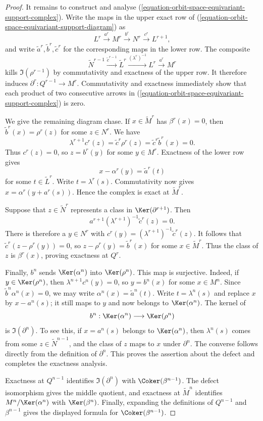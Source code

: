 \begin{proof}
It remains to construct and analyse
(\ref{equation-orbit-space-equivariant-support-complex}). Write the maps in
the upper exact row of
(\ref{equation-orbit-space-equivariant-support-diagram}) as
$$
L^r\xrightarrow{a^r}M^r\xrightarrow{b^r}N^r
\xrightarrow{c^r}L^{r+1},
$$
and write $\widetilde a^r,\widetilde b^r,\widetilde c^r$ for the
corresponding maps in the lower row. The composite
$$
\widetilde N^{r-1}\xrightarrow{\widetilde c^{r-1}}
\widetilde L^r\xrightarrow{(\lambda^r)^{-1}}L^r
\xrightarrow{a^r}M^r
$$
kills $\Im(\rho^{r-1})$ by commutativity and exactness of the upper row.
It therefore induces $\partial^r:Q^{r-1}\to M^r$. Commutativity and
exactness immediately show that each product of two consecutive arrows in
(\ref{equation-orbit-space-equivariant-support-complex}) is zero.

We give the remaining diagram chase. If
$x\in\widetilde M^r$ has $\beta^r(x)=0$, then
$\widetilde b^r(x)=\rho^r(z)$ for some $z\in N^r$. We have
$$
\lambda^{r+1}c^r(z)
=\widetilde c^r\rho^r(z)
=\widetilde c^r\widetilde b^r(x)=0.
$$
Thus $c^r(z)=0$, so $z=b^r(y)$ for some $y\in M^r$. Exactness of the
lower row gives
$$
x-\alpha^r(y)=\widetilde a^r(t)
$$
for some $t\in\widetilde L^r$. Write $t=\lambda^r(s)$. Commutativity now
gives $x=\alpha^r(y+a^r(s))$. Hence the complex is exact at
$\widetilde M^r$.

Suppose that $z\in\widetilde N^r$ represents a class in
$\Ker(\partial^{r+1})$. Then
$$
a^{r+1}(\lambda^{r+1})^{-1}\widetilde c^r(z)=0.
$$
There is therefore a $y\in N^r$ with
$c^r(y)=(\lambda^{r+1})^{-1}\widetilde c^r(z)$. It follows that
$\widetilde c^r(z-\rho^r(y))=0$, so
$z-\rho^r(y)=\widetilde b^r(x)$ for some $x\in\widetilde M^r$. Thus the
class of $z$ is $\beta^r(x)$, proving exactness at $Q^r$.

Finally, $b^n$ sends $\Ker(\alpha^n)$ into $\Ker(\rho^n)$. This map is
surjective. Indeed, if $y\in\Ker(\rho^n)$, then
$\lambda^{n+1}c^n(y)=0$, so $y=b^n(x)$ for some $x\in M^n$. Since
$\widetilde b^n\alpha^n(x)=0$, we may write
$\alpha^n(x)=\widetilde a^n(t)$. Write $t=\lambda^n(s)$ and replace $x$ by
$x-a^n(s)$; it still maps to $y$ and now belongs to
$\Ker(\alpha^n)$. The kernel of
$$
b^n:\Ker(\alpha^n)\longrightarrow\Ker(\rho^n)
$$
is $\Im(\partial^n)$. To see this, if $x=a^n(s)$ belongs to
$\Ker(\alpha^n)$, then $\lambda^n(s)$ comes from some
$z\in\widetilde N^{n-1}$, and the class of $z$ maps to $x$ under
$\partial^n$. The converse follows directly from the definition of
$\partial^n$. This proves the assertion about the defect and completes the
exactness analysis.

Exactness at $Q^{n-1}$ identifies $\Im(\partial^n)$ with
$\Coker(\beta^{n-1})$. The defect isomorphism gives the middle quotient,
and exactness at $\widetilde M^n$ identifies
$M^n/\Ker(\alpha^n)$ with $\Ker(\beta^n)$. Finally, expanding the
definitions of $Q^{n-1}$ and $\beta^{n-1}$ gives the displayed formula for
$\Coker(\beta^{n-1})$.
\end{proof}


